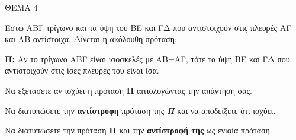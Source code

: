 
ΘΕΜΑ 4

Έστω ΑΒΓ τρίγωνο και τα ύψη του ΒΕ και ΓΔ που αντιστοιχούν στις πλευρές ΑΓ και ΑΒ αντίστοιχα. Δίνεται η ακόλουθη πρόταση:

\textbf{Π:} Αν το τρίγωνο ΑΒΓ είναι ισοσκελές με ΑΒ=ΑΓ, τότε τα ύψη ΒΕ και ΓΔ που αντιστοιχούν στις ίσες πλευρές του είναι ίσα.

\begin{alist}
\item Να εξετάσετε αν ισχύει η πρόταση \textbf{Π} αιτιολογώντας την απάντησή σας.


\item Να διατυπώσετε την \textbf{αντίστροφη} πρόταση της \emph{\textbf{Π}} και να αποδείξετε ότι ισχύει.


\item Να διατυπώσετε την πρόταση \textbf{Π} και την \textbf{αντίστροφή της} ως ενιαία πρόταση.

\end{alist}
